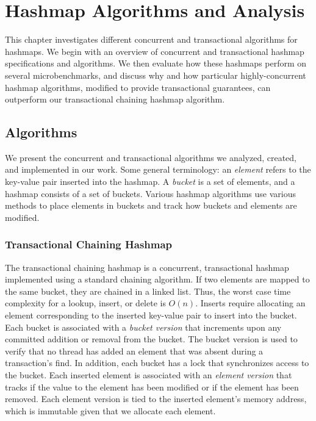 \chapter{Hashmap Algorithms and Analysis}
\label{hashmap}

This chapter investigates different concurrent and transactional algorithms for hashmaps. We begin with an overview of concurrent and transactional hashmap specifications and algorithms. We then evaluate how these hashmaps perform on several microbenchmarks, and discuss why and how particular highly-concurrent hashmap algorithms, modified to provide transactional guarantees, can outperform our transactional chaining hashmap algorithm.

\section{Algorithms}

We present the concurrent and transactional algorithms we analyzed, created, and implemented in our work. Some general terminology: an \emph{element} refers to the key-value pair inserted into the hashmap. A \emph{bucket} is a set of elements, and a hashmap consists of a set of buckets. Various hashmap algorithms use various methods to place elements in buckets and track how buckets and elements are modified.

\subsection{Transactional Chaining Hashmap}
The transactional chaining hashmap is a concurrent, transactional hashmap implemented using a standard chaining algorithm. If two elements are mapped to the same bucket, they are chained in a linked list. Thus, the worst case time complexity for a lookup, insert, or delete is $O(n)$. Inserts require allocating an element corresponding to the inserted key-value pair to insert into the bucket. Each bucket is associated with a \emph{bucket version} that increments upon any committed addition or removal from the bucket. The bucket version is used to verify that no thread has added an element that was absent during a transaction's find. In addition, each bucket has a lock that synchronizes access to the bucket. Each inserted element is associated with an \emph{element version} that tracks if the value to the element has been modified or if the element has been removed. Each element version is tied to the inserted element's memory address, which is immutable given that we allocate each element.

